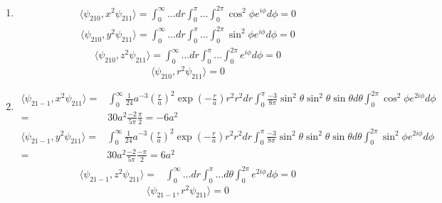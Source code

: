 \begin{enumerate}
\begin{enumerate}
     \item 
    \begin{align*}
        \langle\psi_{210},x^2\psi_{211}\rangle=
        \int_0^\infty 
        \dots dr
        \int_0^\pi 
        \dots
        \int_0^{2\pi}
        \cos^2\phi 
        e^{i\phi}
         d\phi
        =0
    \end{align*}
    \begin{align*}
        \langle\psi_{210},y^2\psi_{211}\rangle=
         \int_0^\infty 
        \dots dr
        \int_0^\pi 
        \dots
        \int_0^{2\pi}
        \sin^2\phi 
        e^{i\phi}
         d\phi
        =0
    \end{align*}
    \begin{align*}
        \langle\psi_{210},z^2\psi_{211}\rangle=
         \int_0^\infty 
        \dots dr
        \int_0^\pi 
        \dots
        \int_0^{2\pi}
        e^{i\phi}
         d\phi
        =0
    \end{align*}
    $$
    \langle\psi_{210},r^2\psi_{211}\rangle=0
    $$

     \item 
    \begin{align*}
        \langle\psi_{21-1},x^2\psi_{211}\rangle=&
        \int_0^\infty 
        \frac{1}{24}
        a^{-3}
        \left(\frac{r}{a}\right)^2
        \exp(-\frac{r}{a})r^2r^2dr
        \int_0^\pi 
        \frac{-3}{8\pi}
        \sin^2\theta 
        \sin^2\theta 
        \sin\theta d\theta 
        \int_0^{2\pi}
        \cos^2\phi e^{2i\phi}
         d\phi\\
        =&30a^2\frac{-2}{5\pi}\frac{\pi}{2} = -6a^2
    \end{align*}
    \begin{align*}
        \langle\psi_{21-1},y^2\psi_{211}\rangle=&
        \int_0^\infty 
        \frac{1}{24}
        a^{-3}
        \left(\frac{r}{a}\right)^2
        \exp(-\frac{r}{a})r^2r^2dr
        \int_0^\pi 
        \frac{-3}{8\pi}
        \sin^2\theta 
        \sin^2\theta 
        \sin\theta d\theta 
        \int_0^{2\pi}
        \sin^2\phi e^{2i\phi}
         d\phi\\
        =&30a^2\frac{-2}{5\pi}\frac{-\pi}{2} = 6a^2
    \end{align*}
    \begin{align*}
        \langle\psi_{21-1},z^2\psi_{211}\rangle=&
        \int_0^\infty 
        \dots dr
        \int_0^\pi 
        \dots d\theta 
        \int_0^{2\pi}
        e^{2i\phi}
         d\phi = 0
    \end{align*}
    $$
    \langle\psi_{21-1},r^2\psi_{211}\rangle=0
    $$


\end{enumerate}
\end{enumerate}

